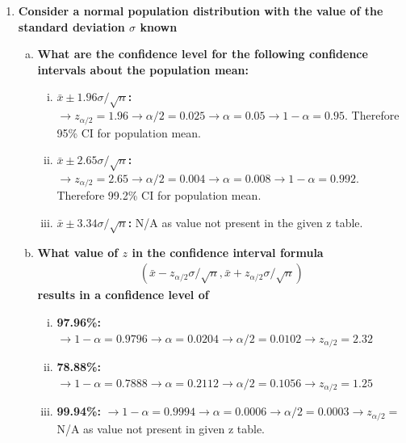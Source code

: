 \documentclass{article}
\begin{document}
\begin{enumerate}[1.]
\item
\textbf{Consider a normal population distribution with the value of the standard deviation $\sigma$ known}
\begin{enumerate}[(a)]
\item
\textbf{What are the confidence level for the following confidence intervals about the population mean:}
\begin{enumerate}[(i)]
  \item \textbf{$\bar{x} \pm 1.96\sigma/\sqrt{n}$: } $\to z_{\alpha/2} = 1.96 \to \alpha/2 = 0.025 \to \alpha = 0.05 \to 1 - \alpha = 0.95.$ Therefore 95\% CI for population mean.
  \item \textbf{$\bar{x} \pm 2.65\sigma/\sqrt{n}$: } $\to z_{\alpha/2} = 2.65 \to \alpha/2 = 0.004 \to \alpha = 0.008 \to 1 - \alpha = 0.992.$ Therefore 99.2\% CI for population mean.
  \item \textbf{$\bar{x} \pm 3.34\sigma/\sqrt{n}$: } N/A as value not present in the given z table.
\end{enumerate}

\item
\textbf{What value of $z$ in the confidence interval formula }
\begin{gather*}
(\bar{x} - z_{\alpha/2}\sigma/\sqrt{n}, \bar{x} + z_{\alpha/2}\sigma/\sqrt{n} )
\end{gather*}
\textbf{results in a confidence level of}

\begin{enumerate}[(i)]
  \item \textbf{97.96\%: } $\to 1 - \alpha = 0.9796 \to \alpha = 0.0204 \to \alpha / 2 = 0.0102 \to z_{\alpha/2} =  2.32$
  \item \textbf{78.88\%: } $\to 1 - \alpha = 0.7888 \to \alpha = 0.2112 \to \alpha / 2 = 0.1056 \to z_{\alpha/2} = 1.25$
  \item \textbf{99.94\%: } $\to 1 - \alpha = 0.9994 \to \alpha = 0.0006 \to \alpha / 2 = 0.0003 \to z_{\alpha/2} = $ N/A as value not present in given z table.
\end{enumerate}
\end{enumerate}


\end{enumerate}
\end{document}
